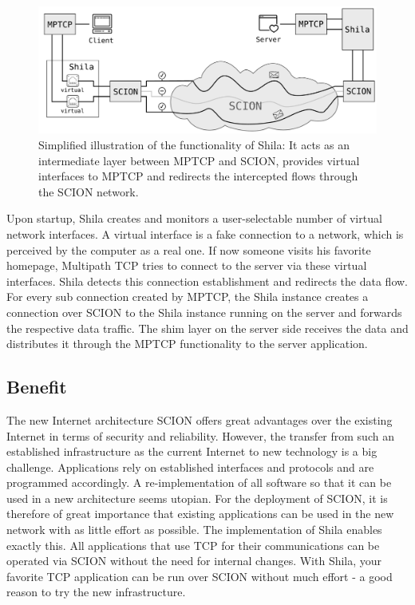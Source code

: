 \begin{figure}[H]
	\begin{center}
		\def\svgwidth{1\textwidth}
		\includegraphics[scale=0.28]{../illustrations/introduction/Shila.pdf} 
		\caption[Caption for the list of figures.]{Simplified illustration of the functionality of Shila: It acts as an intermediate layer between MPTCP and SCION, provides virtual interfaces to MPTCP and redirects the intercepted flows through the SCION network.}
		\label{fig:IntroRoleOfShila}
	\end{center}
\end{figure}

Upon startup, Shila creates and monitors a user-selectable number of virtual network interfaces. A virtual interface is a fake connection to a network, which is perceived by the computer as a real one. If now someone visits his favorite homepage, Multipath TCP tries to connect to the server via these virtual interfaces. Shila detects this connection establishment and redirects the data flow.  For every sub connection created by MPTCP, the Shila instance creates a connection over SCION to the Shila instance running on the server and forwards the respective data traffic. The shim layer on the server side receives the data and distributes it through the MPTCP functionality to the server application.

\subsection*{Benefit}

The new Internet architecture SCION offers great advantages over the existing Internet in terms of security and reliability. However, the transfer from such an established infrastructure as the current Internet to new technology is a big challenge. Applications rely on established interfaces and protocols and are programmed accordingly. A re-implementation of all software so that it can be used in a new architecture seems utopian. For the deployment of SCION, it is therefore of great importance that existing applications can be used in the new network with as little effort as possible. The implementation of Shila enables exactly this. All applications that use TCP for their communications can be operated via SCION without the need for internal changes. With Shila, your favorite TCP application can be run over SCION without much effort - a good reason to try the new infrastructure.


